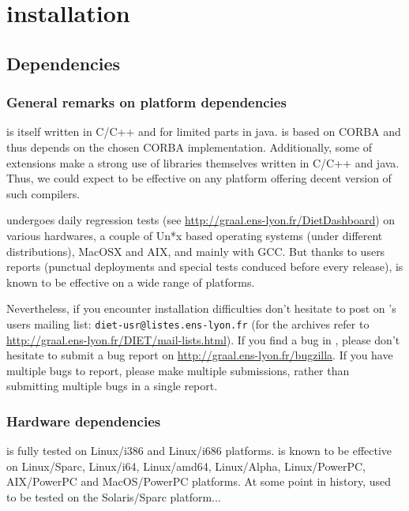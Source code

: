 \chapter{\diet installation}
\label{ch:installing}

\section{Dependencies}
\label{sec:dependencies}

\subsection{General remarks on \diet platform dependencies}

\diet is itself written in C/C++ and for limited parts in java. \diet is based
on CORBA and thus depends on the chosen CORBA implementation.  Additionally,
some of \diet extensions make a strong use of libraries themselves written in
C/C++ and java. Thus, we could expect \diet to be effective on any platform
offering decent version of such compilers.

\diet undergoes daily regression tests (see
\url{http://graal.ens-lyon.fr/DietDashboard}) on various hardwares, a couple of
Un*x based operating systems (under different distributions), MacOSX and AIX,
and mainly with GCC. But thanks to users reports (punctual deployments and
special tests conduced before every release), \diet is known to be effective on
a wide range of platforms.

Nevertheless, if you encounter installation difficulties don't hesitate to post
on \diet's users mailing list: \verb+diet-usr@listes.ens-lyon.fr+ (for the
archives refer to \url{http://graal.ens-lyon.fr/DIET/mail-lists.html}).  If you
find a bug in \diet, please don't hesitate to submit a bug report on
\url{http://graal.ens-lyon.fr/bugzilla}. If you have multiple bugs to report,
please make multiple submissions, rather than submitting multiple bugs in a
single report.

\subsection{Hardware dependencies}
\diet is fully tested on Linux/i386 and Linux/i686 platforms. \diet is known to
be effective on Linux/Sparc, Linux/i64, Linux/amd64, Linux/Alpha,
Linux/PowerPC, AIX/PowerPC and MacOS/PowerPC platforms.  At some point in \diet
history, \diet used to be tested on the Solaris/Sparc platform...

